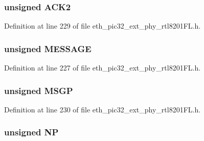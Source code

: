 \subsubsection[{A\+C\+K2}]{\setlength{\rightskip}{0pt plus 5cm}unsigned A\+C\+K2}\label{union_____a_n_l_p_a_d_n_pbits__t_a04eefaff71d440a3996c7db3676475ba}


Definition at line 229 of file eth\+\_\+pic32\+\_\+ext\+\_\+phy\+\_\+rtl8201\+F\+L.\+h.

\hypertarget{union_____a_n_l_p_a_d_n_pbits__t_a06361005f0d2faefe34e0bdb1499bfe7}{}
\subsubsection[{M\+E\+S\+S\+A\+G\+E}]{\setlength{\rightskip}{0pt plus 5cm}unsigned M\+E\+S\+S\+A\+G\+E}\label{union_____a_n_l_p_a_d_n_pbits__t_a06361005f0d2faefe34e0bdb1499bfe7}


Definition at line 227 of file eth\+\_\+pic32\+\_\+ext\+\_\+phy\+\_\+rtl8201\+F\+L.\+h.

\hypertarget{union_____a_n_l_p_a_d_n_pbits__t_a8c958300dd9e82d064f59696a78d8e45}{}
\subsubsection[{M\+S\+G\+P}]{\setlength{\rightskip}{0pt plus 5cm}unsigned M\+S\+G\+P}\label{union_____a_n_l_p_a_d_n_pbits__t_a8c958300dd9e82d064f59696a78d8e45}


Definition at line 230 of file eth\+\_\+pic32\+\_\+ext\+\_\+phy\+\_\+rtl8201\+F\+L.\+h.

\hypertarget{union_____a_n_l_p_a_d_n_pbits__t_ac89729be1dc289730931f8238a316516}{}
\subsubsection[{N\+P}]{\setlength{\rightskip}{0pt plus 5cm}unsigned N\+P}\label{union_____a_n_l_p_a_d_n_pbits__t_ac89729be1dc289730931f8238a316516}


